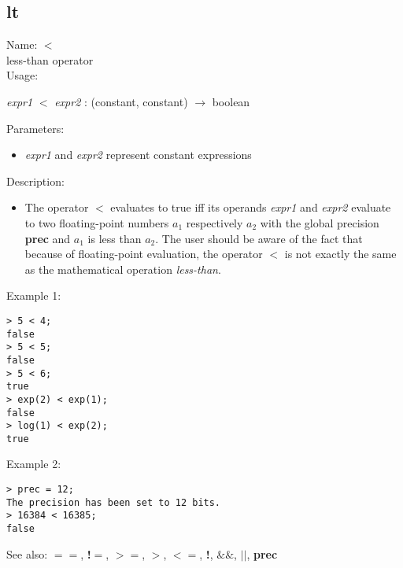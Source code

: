 \subsection{ lt }
\noindent Name: \textbf{$<$}\\
less-than operator\\

\noindent Usage: 
\begin{center}
\emph{expr1} \textbf{$<$} \emph{expr2} : (\textsf{constant}, \textsf{constant}) $\rightarrow$ \textsf{boolean}\\
\end{center}
Parameters: 
\begin{itemize}
\item \emph{expr1} and \emph{expr2} represent constant expressions
\end{itemize}
\noindent Description: \begin{itemize}

\item The operator \textbf{$<$} evaluates to true iff its operands \emph{expr1} and
   \emph{expr2} evaluate to two floating-point numbers $a_1$
   respectively $a_2$ with the global precision \textbf{prec} and
   $a_1$ is less than $a_2$. The user should
   be aware of the fact that because of floating-point evaluation, the
   operator \textbf{$<$} is not exactly the same as the mathematical
   operation \emph{less-than}.
\end{itemize}
\noindent Example 1: 
\begin{center}\begin{minipage}{15cm}\begin{Verbatim}[frame=single]
> 5 < 4;
false
> 5 < 5;
false
> 5 < 6;
true
> exp(2) < exp(1);
false
> log(1) < exp(2);
true
\end{Verbatim}
\end{minipage}\end{center}
\noindent Example 2: 
\begin{center}\begin{minipage}{15cm}\begin{Verbatim}[frame=single]
> prec = 12;
The precision has been set to 12 bits.
> 16384 < 16385;
false
\end{Verbatim}
\end{minipage}\end{center}
See also: \textbf{$==$}, \textbf{!$=$}, \textbf{$>=$}, \textbf{$>$}, \textbf{$<=$}, \textbf{!}, \textbf{$\&\&$}, \textbf{$||$}, \textbf{prec}
